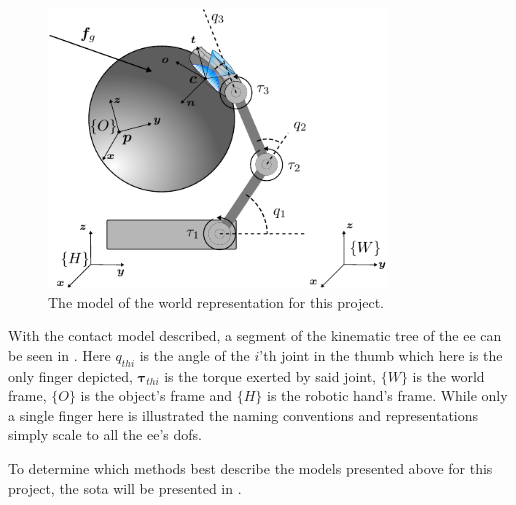 
\begin{figure}[h]
	\begin{small}
		\begin{center}
			\includegraphics[width=0.8\textwidth]{chapters/modeling/fig/test-hand-kinematics-crop.pdf}
		\end{center}
		\caption{The model of the world representation for this project.}
		\label{fig:full-system-model}
	\end{small}
\end{figure}

With the contact model described, a segment of the kinematic tree of the \gls{ee} can be seen in . Here $q_{thi}$ is the angle of the $i$'th joint in the thumb which here is the only finger depicted, $\boldsymbol{\tau}_{thi}$ is the torque exerted by said joint, $\{W\}$ is the world frame, $\{O\}$ is the object's frame and $\{H\}$ is the robotic hand's frame. While only a single finger here is illustrated the naming conventions and representations simply scale to all the \gls{ee}'s \gls{dof}s.\medskip

To determine which methods best describe the models presented above for this project, the \gls{sota} will be presented in .

